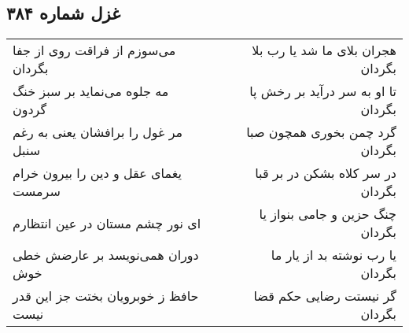 \begin{center}
\section*{غزل شماره ۳۸۴}
\label{sec:sh384}
\begin{longtable}{l p{0.5cm} r}
می‌سوزم از فراقت روی از جفا بگردان
&&
هجران بلای ما شد یا رب بلا بگردان
\\
مه جلوه می‌نماید بر سبز خنگ گردون
&&
تا او به سر درآید بر رخش پا بگردان
\\
مر غول را برافشان یعنی به رغم سنبل
&&
گرد چمن بخوری همچون صبا بگردان
\\
یغمای عقل و دین را بیرون خرام سرمست
&&
در سر کلاه بشکن در بر قبا بگردان
\\
ای نور چشم مستان در عین انتظارم
&&
چنگ حزین و جامی بنواز یا بگردان
\\
دوران همی‌نویسد بر عارضش خطی خوش
&&
یا رب نوشته بد از یار ما بگردان
\\
حافظ ز خوبرویان بختت جز این قدر نیست
&&
گر نیستت رضایی حکم قضا بگردان
\\
\end{longtable}
\end{center}
